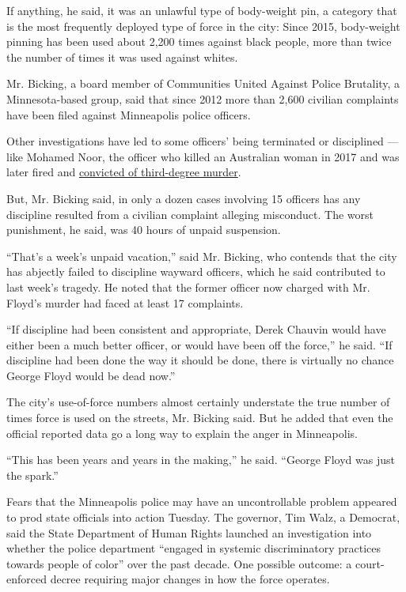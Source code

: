 If anything, he said, it was an unlawful type of body-weight pin, a
category that is the most frequently deployed type of force in the city:
Since 2015, body-weight pinning has been used about 2,200 times against
black people, more than twice the number of times it was used against
whites.

Mr. Bicking, a board member of Communities United Against Police
Brutality, a Minnesota-based group, said that since 2012 more than 2,600
civilian complaints have been filed against Minneapolis police officers.

Other investigations have led to some officers' being terminated or
disciplined --- like Mohamed Noor, the officer who killed an Australian
woman in 2017 and was later fired and
\href{https://www.nytimes3xbfgragh.onion/2019/04/30/us/minneapolis-police-noor-verdict.html}{convicted
of third-degree murder}.

But, Mr. Bicking said, in only a dozen cases involving 15 officers has
any discipline resulted from a civilian complaint alleging misconduct.
The worst punishment, he said, was 40 hours of unpaid suspension.

``That's a week's unpaid vacation,'' said Mr. Bicking, who contends that
the city has abjectly failed to discipline wayward officers, which he
said contributed to last week's tragedy. He noted that the former
officer now charged with Mr. Floyd's murder had faced at least 17
complaints.

``If discipline had been consistent and appropriate, Derek Chauvin would
have either been a much better officer, or would have been off the
force,'' he said. ``If discipline had been done the way it should be
done, there is virtually no chance George Floyd would be dead now.''

The city's use-of-force numbers almost certainly understate the true
number of times force is used on the streets, Mr. Bicking said. But he
added that even the official reported data go a long way to explain the
anger in Minneapolis.

``This has been years and years in the making,'' he said. ``George Floyd
was just the spark.''

Fears that the Minneapolis police may have an uncontrollable problem
appeared to prod state officials into action Tuesday. The governor, Tim
Walz, a Democrat, said the State Department of Human Rights launched an
investigation into whether the police department ``engaged in systemic
discriminatory practices towards people of color'' over the past decade.
One possible outcome: a court-enforced decree requiring major changes in
how the force operates.

